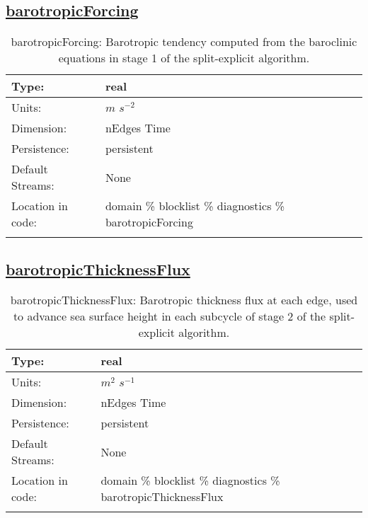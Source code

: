 \subsection[barotropicForcing]{\hyperref[sec:var_tab_diagnostics]{barotropicForcing}}
\label{subsec:var_sec_diagnostics_barotropicForcing}
\begin{center}
\begin{longtable}{| p{2.0in} | p{4.0in} |}
        \hline 
        Type: & real \\
        \hline 
        Units: & $m$ $s^{-2}$ \\
        \hline 
        Dimension: & nEdges Time \\
        \hline 
        Persistence: & persistent \\
        \hline 
		 Default Streams: & None \\
        \hline 
		 Location in code: & domain \% blocklist \% diagnostics \% barotropicForcing \\
		 \hline 
    \caption{barotropicForcing: Barotropic tendency computed from the baroclinic equations in stage 1 of the split-explicit algorithm.}
\end{longtable}
\end{center}
\subsection[barotropicThicknessFlux]{\hyperref[sec:var_tab_diagnostics]{barotropicThicknessFlux}}
\label{subsec:var_sec_diagnostics_barotropicThicknessFlux}
\begin{center}
\begin{longtable}{| p{2.0in} | p{4.0in} |}
        \hline 
        Type: & real \\
        \hline 
        Units: & $m^2$ $s^{-1}$ \\
        \hline 
        Dimension: & nEdges Time \\
        \hline 
        Persistence: & persistent \\
        \hline 
		 Default Streams: & None \\
        \hline 
		 Location in code: & domain \% blocklist \% diagnostics \% barotropicThicknessFlux \\
		 \hline 
    \caption{barotropicThicknessFlux: Barotropic thickness flux at each edge, used to advance sea surface height in each subcycle of stage 2 of the split-explicit algorithm.}
\end{longtable}
\end{center}
